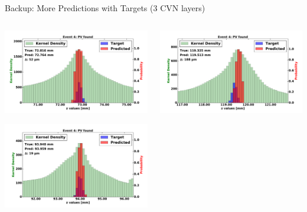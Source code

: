 \begin{frame}{Backup: More Predictions with Targets (3 CVN layers)}
  \begin{columns}[c]
        \begin{center}
            \includegraphics[width=1\textwidth,height=0.45\textwidth, trim=18 0 18 0]{images/120000_3layer_24.pdf}
    
            \includegraphics[width=1\textwidth, height=0.45\textwidth,trim=18 0 18 0]{images/120000_3layer_25.pdf}

        \end{center}
        \begin{center}
           \includegraphics[width=1\textwidth, height=0.45\textwidth, trim=18 0 18 0]{images/120000_3layer_26.pdf}
    

\end{center}
\end{columns}
\end{frame}
